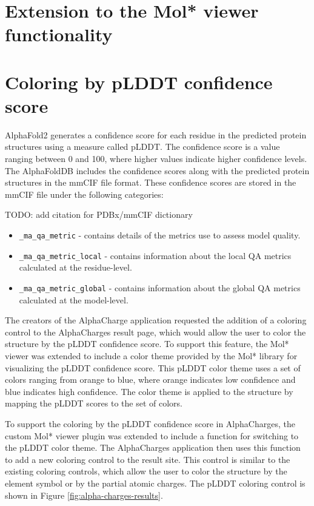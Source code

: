 \documentclass[
  digital,     %
  oneside,     %
  nosansbold,  %
  nocolorbold, %
  lof,         %
  lot,         %
]{fithesis4}
\begin{document}
\section{Extension to the Mol* viewer functionality}

\section{Coloring by pLDDT confidence score}

AlphaFold2 generates a confidence score for each residue in the predicted protein structures using a measure called pLDDT. The confidence score is a value ranging between 0 and 100, where higher values indicate higher confidence levels. \parencite{varadi2021alphafold} The AlphaFoldDB includes the confidence scores along with the predicted protein structures in the mmCIF file format. These confidence scores are stored in the mmCIF file under the following categories:

TODO: add citation for PDBx/mmCIF dictionary

\begin{itemize}
  \item \texttt{\_ma\_qa\_metric} - contains details of the metrics use to assess model quality.
  \item \texttt{\_ma\_qa\_metric\_local} - contains information about the local QA metrics calculated at the residue-level.
  \item \texttt{\_ma\_qa\_metric\_global} - contains information about the global QA metrics calculated at the model-level.
\end{itemize}

The creators of the AlphaCharge application requested the addition of a coloring control to the AlphaCharges result page, which would allow the user to color the structure by the pLDDT confidence score. To support this feature, the Mol* viewer was extended to include a color theme provided by the Mol* library for visualizing the pLDDT confidence score. This pLDDT color theme uses a set of colors ranging from orange to blue, where orange indicates low confidence and blue indicates high confidence. The color theme is applied to the structure by mapping the pLDDT scores to the set of colors.

To support the coloring by the pLDDT confidence score in AlphaCharges, the custom Mol* viewer plugin was extended to include a function for switching to the pLDDT color theme. The AlphaCharges application then uses this function to add a new coloring control to the result site. This control is similar to the existing coloring controls, which allow the user to color the structure by the element symbol or by the partial atomic charges. The pLDDT coloring control is shown in Figure \ref{fig:alpha-charges-results}.
\end{document}

